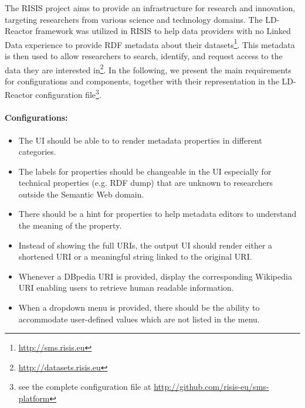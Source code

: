 \documentclass{llncs}
\begin{document}
The RISIS project aims to provide an infrastructure for research and innovation, targeting researchers from various science and technology domains.
The LD-Reactor framework was utilized in RISIS to help data providers with no Linked Data experience to provide RDF metadata about their datasets\footnote{\url{http://sms.risis.eu}}. This metadata is then used to allow researchers to search, identify, and request access to the data they are interested in\footnote{\url{http://datasets.risis.eu}}.
In the following, we present the main requirements for configurations and components, together with their representation in the LD-Reactor configuration file\footnote{see the complete configuration file at \url{http://github.com/risis-eu/sms-platform}}.
\vspace{-1em}
\paragraph{Configurations:}
\small
\begin{itemize}
 \item The UI should be able to to render metadata properties in different categories. %
 \item The labels for properties should be changeable in the UI especially for technical properties (e.g. RDF dump) that are unknown to researchers outside the Semantic Web domain.%
 \item There should be a hint for properties to help metadata editors to understand the meaning of the property.%
 \item Instead of showing the full URIs, the output UI should render either a shortened URI or a meaningful string linked to the original URI.%
 \item Whenever a DBpedia URI is provided, display the corresponding Wikipedia URI enabling users to retrieve human readable information.%
 \item When a dropdown menu is provided, there should be the ability to accommodate user-defined values which are not listed in the menu.%

\end{itemize}
\end{document}
